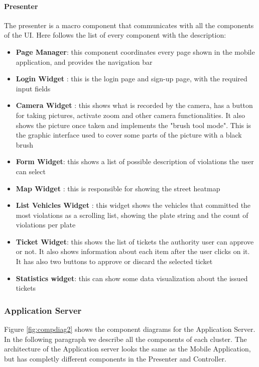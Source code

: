 \paragraph{Presenter}
The presenter is a macro component that communicates with all the components of the UI.
Here follows the list of every component with the description:
\begin{itemize}
  \item \textbf{Page Manager}: this component coordinates every page shown in the mobile application, and provides the navigation bar
  \item \textbf{Login Widget} : this is the login page and sign-up page, with the required input fields
  \item \textbf{Camera Widget} : this shows what is recorded by the camera, has a button for taking pictures, activate zoom and other camera functionalities. It also shows the picture once taken and implements the "brush tool mode". This is the graphic interface used to cover some parts of the picture with a black brush
  \item \textbf{Form Widget}: this shows a list of possible description of violations the user can select
  \item \textbf{Map Widget} : this is responsible for showing the street heatmap
  \item \textbf{List Vehicles Widget} : this widget shows the vehicles that committed the most violations as a scrolling list, showing the plate string and the count of violations per plate
  \item \textbf{Ticket Widget}: this shows the list of tickets the authority user can approve or not. It also shows information about each item after the user clicks on it. It has also two buttons to approve or discard the selected ticket
  \item \textbf{Statistics widget}: this can show some data visualization about the issued tickets
\end{itemize}



\subsubsection{Application Server} \label{API}
Figure \ref{fig:compdiag2} shows the component diagrams for the Application Server. In the following paragraph we describe all the components of each cluster.
The architecture of the Application server looks the same as the Mobile Application, but has completly different components in the Presenter and Controller.

